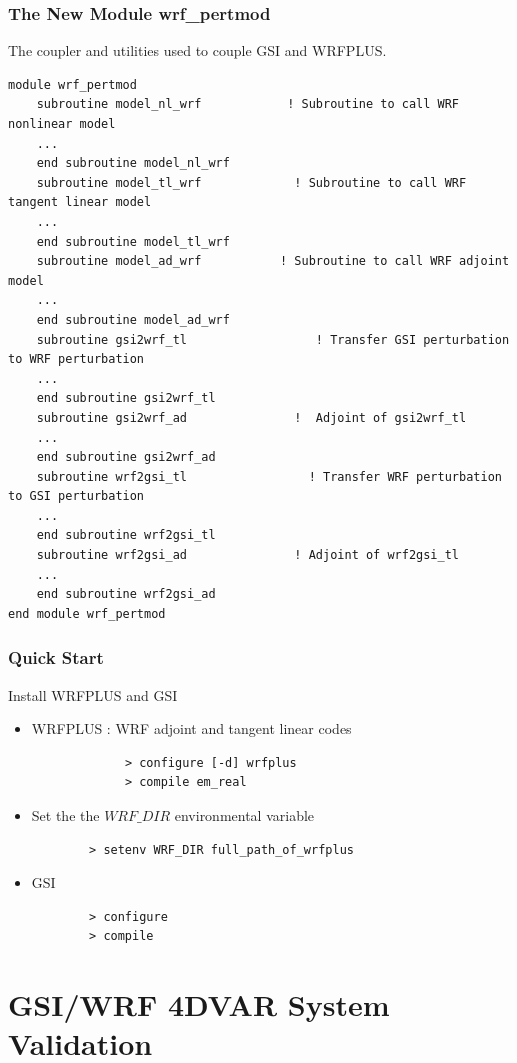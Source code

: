 \documentclass[10pt]{beamer}
\begin{document}
\begin{frame}[fragile]
\frametitle{The New Module wrf\_pertmod}
The coupler and utilities used to couple GSI and WRFPLUS.
\begin{beamerboxesrounded}[ lower=postit,shadow=true]{}
{\tiny
\begin{verbatim}
module wrf_pertmod
    subroutine model_nl_wrf            ! Subroutine to call WRF nonlinear model
    ...
    end subroutine model_nl_wrf
    subroutine model_tl_wrf             ! Subroutine to call WRF tangent linear model
    ...
    end subroutine model_tl_wrf
    subroutine model_ad_wrf           ! Subroutine to call WRF adjoint model
    ...
    end subroutine model_ad_wrf
    subroutine gsi2wrf_tl                  ! Transfer GSI perturbation to WRF perturbation
    ...
    end subroutine gsi2wrf_tl
    subroutine gsi2wrf_ad               !  Adjoint of gsi2wrf_tl
    ...
    end subroutine gsi2wrf_ad
    subroutine wrf2gsi_tl                 ! Transfer WRF perturbation to GSI perturbation
    ...
    end subroutine wrf2gsi_tl
    subroutine wrf2gsi_ad               ! Adjoint of wrf2gsi_tl
    ...
    end subroutine wrf2gsi_ad
end module wrf_pertmod
\end{verbatim}
}
\end{beamerboxesrounded}
\end{frame}

\begin{frame}[fragile]
\frametitle{Quick Start}
Install WRFPLUS and GSI
   \begin{itemize}
        	\item WRFPLUS : WRF adjoint and tangent linear codes
		\begin{verbatim}
	         > configure [-d] wrfplus
	         > compile em_real
	         \end{verbatim}
	\item Set the the $WRF\_DIR$ environmental variable
		\begin{verbatim} 
		> setenv WRF_DIR full_path_of_wrfplus  
		\end{verbatim}
	\item GSI
		\begin{verbatim}
		> configure
		> compile
		\end{verbatim}
    \end{itemize}
\end{frame}

\section{GSI/WRF 4DVAR System Validation}
\end{document}
